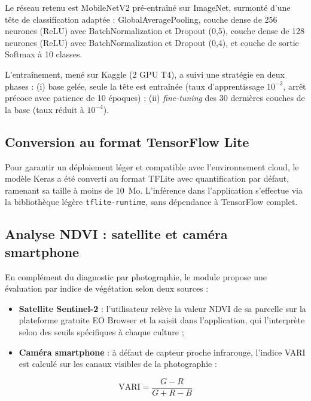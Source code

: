 Le réseau retenu est MobileNetV2 \cite{sandler2018mobilenetv2}
pré-entraîné sur ImageNet, surmonté d'une tête de classification
adaptée : GlobalAveragePooling, couche dense de 256 neurones
(ReLU) avec BatchNormalization et Dropout (0,5), couche dense de
128 neurones (ReLU) avec BatchNormalization et Dropout (0,4), et
couche de sortie Softmax à 10 classes.

L'entraînement, mené sur Kaggle (2 GPU T4), a suivi une stratégie
en deux phases : (i) base gelée, seule la tête est entraînée
(taux d'apprentissage $10^{-3}$, arrêt précoce avec patience de
10 époques) ; (ii) \textit{fine-tuning} des 30 dernières couches
de la base (taux réduit à $10^{-4}$).

\subsection{Conversion au format TensorFlow Lite}

Pour garantir un déploiement léger et compatible avec
l'environnement cloud, le modèle Keras a été converti au format
TFLite \cite{tensorflow2023} avec quantification par défaut,
ramenant sa taille à moins de 10~Mo. L'inférence dans
l'application s'effectue via la bibliothèque légère
\texttt{tflite-runtime}, sans dépendance à TensorFlow complet.

\subsection{Analyse NDVI : satellite et caméra smartphone}

En complément du diagnostic par photographie, le module propose
une évaluation par indice de végétation selon deux sources :

\begin{itemize}[leftmargin=1.2cm]
	\item \textbf{Satellite Sentinel-2} \cite{sentinel2esa} :
	l'utilisateur relève la valeur NDVI de sa parcelle sur
	la plateforme gratuite EO Browser et la saisit dans
	l'application, qui l'interprète selon des seuils
	spécifiques à chaque culture ;
	\item \textbf{Caméra smartphone} : à défaut de capteur proche
	infrarouge, l'indice VARI est calculé sur les canaux
	visibles de la photographie :
\end{itemize}

\begin{equation}
	\text{VARI} = \frac{G - R}{G + R - B}
	\label{eq:vari}
\end{equation}

